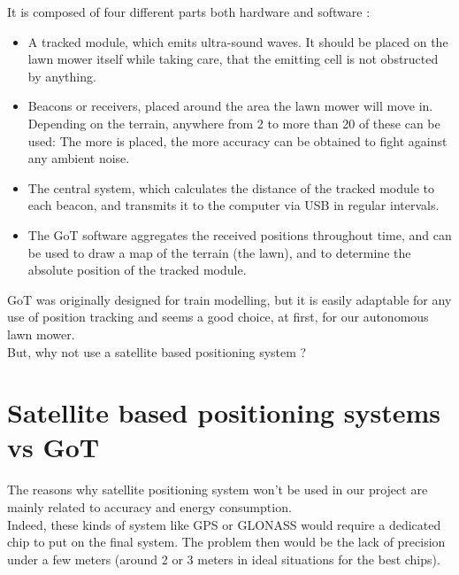 \noindent
It is composed of four different parts both hardware and software :
\begin{itemize}
	\item A tracked module, which emits ultra-sound waves. It should be placed on the lawn mower itself while taking care, that the emitting cell is not obstructed by anything.
	\item Beacons or receivers, placed around the area the lawn mower will move in. Depending on the terrain, anywhere from 2  to more than 20 of these can be used: The more is placed, the more accuracy can be obtained to fight against any ambient noise.
	\item The central system, which calculates the distance of the tracked module to each beacon, and transmits it to the computer via USB in regular intervals.
	\item The GoT software aggregates the received positions throughout time, and can be used to draw a map of the terrain (the lawn), and to determine the absolute position of the tracked module.
\end{itemize}
GoT was originally designed for train modelling, but it is easily adaptable for any use of position tracking and seems a good choice, at first, for our autonomous lawn mower.\\
But, why not use a satellite based positioning system ?

\section{Satellite based positioning systems vs GoT}
The reasons why satellite positioning system won't be used in our project are mainly related to accuracy and energy consumption.\\

\noindent
Indeed, these kinds of system like GPS or GLONASS would require a dedicated chip to put on the final system. The problem then would be the lack of precision under a few meters (around 2 or 3 meters in ideal situations for the best chips).  \\

